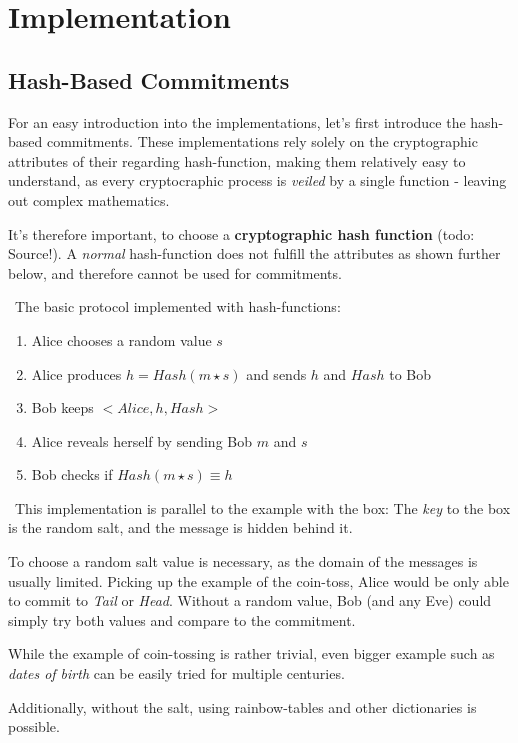 
\section{Implementation}
\subsection{Hash-Based Commitments}
For an easy introduction into the implementations, let's first introduce the hash-based commitments. 
These implementations rely solely on the cryptographic attributes of their regarding hash-function, making them relatively easy to understand, as every cryptocraphic process is \textit{veiled} by a single function - leaving out complex mathematics.

It's therefore important, to choose a \textbf{cryptographic hash function} (todo: Source!). A \textit{normal} hash-function does not fulfill the attributes as shown further below, and therefore cannot be used for commitments. 

~\newline The basic protocol implemented with hash-functions:
	\begin{enumerate}
		\item Alice chooses a random value $s$
		\item Alice produces $h = Hash(m \star s)$ and sends $h$ and $Hash$ to Bob
		\item Bob keeps $<Alice,h,Hash>$
		\item Alice reveals herself by sending Bob $m$ and $s$
		\item Bob checks if $Hash(m \star s) \equiv h$
	\end{enumerate}
~\newline This implementation is parallel to the example with the box: The \textit{key} to the box is the random salt, and the message is hidden behind it. 

To choose a random salt value is necessary, as the domain of the messages is usually limited. Picking up the example of the coin-toss, Alice would be only able to commit to \textit{Tail} or \textit{Head}. Without a random value, Bob (and any Eve) could simply try both values and compare to the commitment. 

While the example of coin-tossing is rather trivial, even bigger example such as \textit{dates of birth} can be easily tried for multiple centuries. 

Additionally, without the salt, using rainbow-tables and other dictionaries is possible. 

